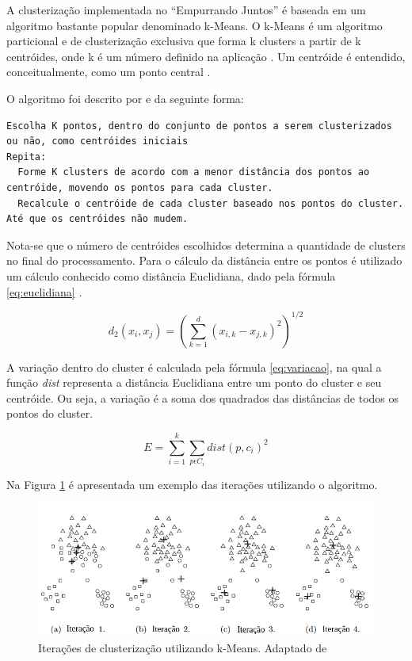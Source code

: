 A clusterização implementada no ``Empurrando Juntos'' é baseada em um algoritmo bastante popular denominado k-Means. O k-Means é um
algoritmo particional e de clusterização exclusiva que forma k clusters a partir de k centróides, onde k é um número definido na aplicação 
\cite{clustering_review, tan2013data}. Um centróide é entendido, conceitualmente, como um ponto central \cite{han2011data}.

O algoritmo foi descrito por  e  da seguinte forma:


\lstset{language=HTML, numbers=left, stepnumber=1}
\begin{lstlisting}
Escolha K pontos, dentro do conjunto de pontos a serem clusterizados ou não, como centróides iniciais
Repita:
  Forme K clusters de acordo com a menor distância dos pontos ao centróide, movendo os pontos para cada cluster.
  Recalcule o centróide de cada cluster baseado nos pontos do cluster.
Até que os centróides não mudem.
\end{lstlisting}

Nota-se que o número de centróides escolhidos determina a quantidade de clusters no final do processamento.
Para o cálculo da distância entre os pontos é utilizado um cálculo conhecido como distância Euclidiana, 
dado pela fórmula \ref{eq:euclidiana} \cite{clustering_review, tan2013data, han2011data}.

\begin{equation} \label{eq:euclidiana}
  d_{2}(x_i, x_j) = (\sum_{k=1}^{d} (x_{i,k} - x_{j,k})^2)^{1/2}
\end{equation}

A variação dentro do cluster é calculada pela fórmula \ref{eq:variacao}, na qual a 
função \textit{dist} representa a distância Euclidiana entre um ponto do
cluster e seu centróide. Ou seja, a variação é a soma dos quadrados
das distâncias de todos os pontos do cluster.

\begin{equation} \label{eq:variacao}
  E = \sum_{i=1}^{k} \sum_{p \epsilon C_{i}} dist(p, c_i)^2
\end{equation}

Na Figura \ref{fig:iteracoes_kmeans} é apresentada um exemplo das iterações utilizando o algoritmo.

\begin{figure}[h!]
\centering
\includegraphics[scale=0.6]{figuras/iteracoes_kmeans.png}
\caption{Iterações de clusterização utilizando k-Means. Adaptado de }
\label{fig:iteracoes_kmeans}
\end{figure}


